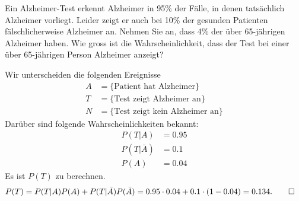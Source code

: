Ein Alzheimer-Test erkennt Alzheimer in 95\% der Fälle, in denen tatsächlich
Alzheimer vorliegt. Leider zeigt er auch bei 10\% der gesunden Patienten
fälschlicherweise Alzheimer an. Nehmen Sie an, dass 4\% der über 65-jährigen
Alzheimer haben.
Wie gross ist die Wahrscheinlichkeit, dass der Test bei einer über
65-jährigen Person Alzheimer anzeigt?


\begin{loesung}
Wir unterscheiden die folgenden Ereignisse
\begin{align*}
A&=\{\text{Patient hat Alzheimer}\}
\\
T&=\{\text{Test zeigt Alzheimer an}\}
\\
N&=\{\text{Test zeigt kein Alzheimer an}\}
\end{align*}
Darüber sind folgende Wahrscheinlichkeiten bekannt:
\begin{align*}
P(T|A)&=0.95\\
P(T|\bar A)&=0.1\\
P(A)&=0.04
\end{align*}
Es ist $P(T)$ zu berechnen.
\begin{align*}
P(T)&=P(T|A)P(A)+P(T|\bar A)P(\bar A)=0.95\cdot 0.04 + 0.1\cdot (1-0.04)
=0.134.
\qedhere
\end{align*}
\end{loesung}

